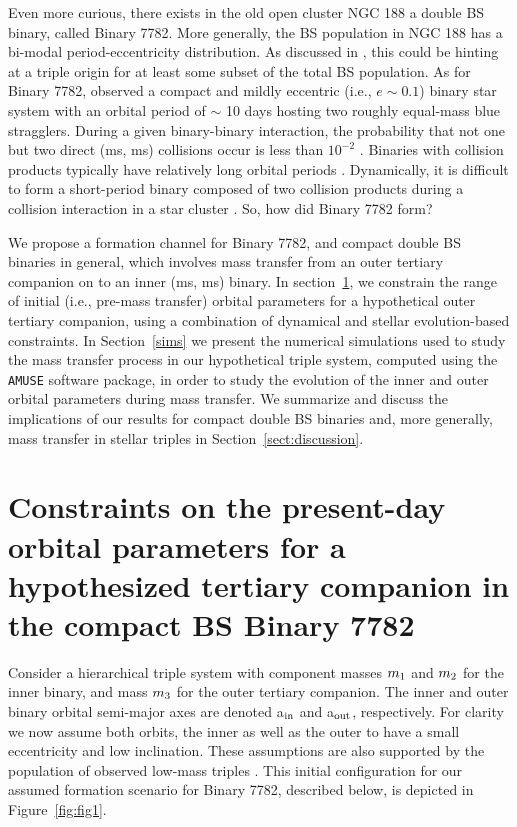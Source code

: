 \documentclass{aastex62}
\begin{document}
Even more curious, there exists in the old open cluster NGC 188 a
double BS binary, called Binary 7782.  More generally, the BS
population in NGC 188 has a bi-modal period-eccentricity distribution.
As discussed in \citet{leigh11}, this could be hinting at a triple
origin for at least some subset of the total BS population.  As for
Binary 7782, \citet{mathieu09} observed a compact and mildly eccentric
(i.e., $e \sim 0.1$) binary star system with an orbital period of
$\sim$ 10 days hosting two roughly equal-mass blue stragglers.  During
a given binary-binary interaction, the probability that not one but
two direct (ms, ms) collisions occur is less than $10^{-2}$
\citep{leonard89,leigh11,leigh12}.  Binaries with collision products
typically have relatively long orbital periods
\cite{2011Sci...334.1380F}. Dynamically, it is difficult to form a
short-period binary composed of two collision products during a
collision interaction in a star cluster \citep{2011Sci...334.1380F}.
So, how did Binary 7782 form?

We propose a formation channel for Binary 7782, and compact double BS
binaries in general, which involves mass transfer from an outer
tertiary companion on to an inner (ms, ms) binary.  In
section~\ref{sect:dyn}, we constrain the range of initial (i.e., pre-mass
transfer) orbital parameters for a hypothetical outer tertiary
companion, using a combination of dynamical and stellar
evolution-based constraints.  In Section~\ref{sims} we present the
numerical simulations used to study the mass transfer process in our
hypothetical triple system, computed using the
\texttt{AMUSE}\cite{AMUSE} software package, in order to study the
evolution of the inner and outer orbital parameters during mass
transfer.  We summarize and discuss the implications of our results
for compact double BS binaries and, more generally, mass transfer in
stellar triples in Section~\ref{sect:discussion}.

\section{Constraints on the present-day orbital parameters for a hypothesized
         tertiary companion in the compact BS Binary 7782} \label{sect:dyn}

Consider a hierarchical triple system with component masses $m_{\rm
  1}$ and $m_{\rm 2}$ for the inner binary, and mass $m_{\rm 3}$ for
the outer tertiary companion.  The inner and outer binary orbital
semi-major axes are denoted a$_{\rm in}$ and a$_{\rm out}$,
respectively.  For clarity we now assume both orbits, the inner as
well as the outer to have a small eccentricity and low inclination.
These assumptions are also supported by the population of observed
low-mass triples \cite{2010yCat..73890925T,moe18}.  This initial
configuration for our assumed formation scenario for Binary 7782,
described below, is depicted in Figure~\ref{fig:fig1}.
\end{document}
